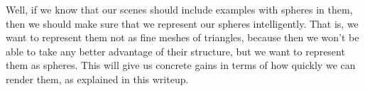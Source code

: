 \documentclass[11pt]{article}
\begin{document}
Well, if we know that our scenes should include examples with spheres in them, then we should make sure that we represent our spheres intelligently. That is, we want to represent them not as fine meshes of triangles, because then we won't be able to take any better advantage of their structure, but we want to represent them as spheres. This will give us concrete gains in terms of how quickly we can render them, as explained in this writeup.
\end{document}
